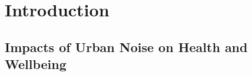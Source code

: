 \documentclass[twoside,fontsize=12pt,titlepage]{scrbook}
\begin{document}
 
 
 
 
 
 \tableofcontents
 \listoffigures
 \listoftables
 
 

\chapter{Introduction}
 
 \section{Impacts of Urban Noise on Health and Wellbeing}
 
\end{document}
